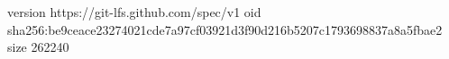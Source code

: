 version https://git-lfs.github.com/spec/v1
oid sha256:be9ceace23274021cde7a97cf03921d3f90d216b5207c1793698837a8a5fbae2
size 262240

